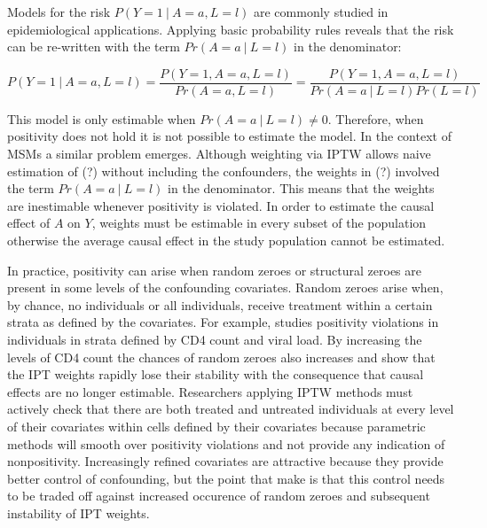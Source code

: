 \documentclass[11pt]{article}
\begin{document}
Models for the risk \(P(Y=1\ |\ A=a, L=l)\) are commonly studied in
epidemiological applications. Applying basic probability rules reveals
that the risk can be re-written with the term \(Pr(A=a\ |\ L=l)\) in the
denominator:

\[P(Y=1\ |\ A=a, L=l) = \frac{P(Y=1, A=a, L=l)}{Pr(A=a, L=l)} = \frac{P(Y=1, A=a, L=l)}{Pr(A=a\ |\ L=l)Pr(L=l)}\]

This model is only estimable when \(Pr(A=a\ |\ L=l) \neq 0\). Therefore,
when positivity does not hold it is not possible to estimate the model.
In the context of MSMs a similar problem emerges. Although weighting via
IPTW allows naive estimation of (?) without including the confounders,
the weights in (?) involved the term \(Pr(A=a\ |\ L=l)\) in the
denominator. This means that the weights are inestimable whenever
positivity is violated. In order to estimate the causal effect of \(A\)
on \(Y\), weights must be estimable in every subset of the population
otherwise the average causal effect in the study population cannot be
estimated. \linebreak

In practice, positivity can arise when random zeroes or structural
zeroes are present in some levels of the confounding covariates. Random
zeroes arise when, by chance, no individuals or all individuals, receive
treatment within a certain strata as defined by the covariates. For
example, \citet{Cole2008} studies positivity violations in individuals
in strata defined by CD4 count and viral load. By increasing the levels
of CD4 count the chances of random zeroes also increases and
\citet{Cole2008} show that the IPT weights rapidly lose their stability
with the consequence that causal effects are no longer estimable.
Researchers applying IPTW methods must actively check that there are
both treated and untreated individuals at every level of their
covariates within cells defined by their covariates because parametric
methods will smooth over positivity violations and not provide any
indication of nonpositivity. Increasingly refined covariates are
attractive because they provide better control of confounding, but the
point that \citet{Cole2008} make is that this control needs to be traded
off against increased occurence of random zeroes and subsequent
instability of IPT weights. \linebreak
\end{document}

